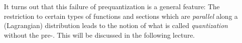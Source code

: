 \documentclass[parskip=half]{scrartcl}
\begin{document}
It turns out that this failure of prequantization is a general feature: The restriction to certain types of functions and sections which are \emph{parallel} along a (Lagrangian) distribution leads to the notion of what is called \emph{quantization} without the pre-. This will be discussed in the following lecture.
\end{document}
